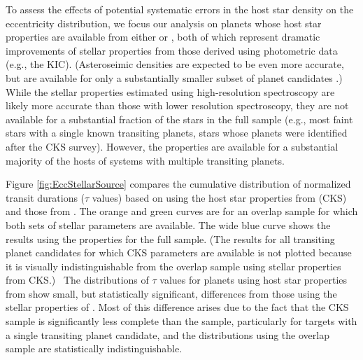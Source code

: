 \documentclass{aastex62}
\begin{document}
To assess the effects of potential systematic errors in the host star density on the eccentricity distribution, we focus our analysis on planets whose host star properties are available from either \citet{Fulton:2018} or \citet{Berger:2020a}, both of which represent dramatic improvements of stellar properties from those derived using photometric data (e.g., the KIC).  (Asteroseimic densities are expected to be even more accurate, but are available for only a substantially smaller subset of planet candidates \citep{vanEylen:2015,vanEylen:2019}.)  
While the stellar properties estimated using high-resolution spectroscopy \citep{Fulton:2018} are likely more accurate than those with lower resolution spectroscopy, they are not available for a substantial fraction of the stars in the full sample (e.g., most faint stars with a single known transiting planets, stars whose planets were identified after the CKS survey).  However, the \cite{Fulton:2018} properties are available for a substantial majority of the hosts of systems with multiple transiting planets.

Figure \ref{fig:EccStellarSource} compares the cumulative distribution of normalized transit durations ($\tau$ values) based on using the  host star properties from \citet{Fulton:2018} (CKS) and those from \citet{Berger:2020a}.  The orange and green curves are for an overlap sample for which both sets of stellar parameters are available.  The wide blue curve shows the results using the \citet{Berger:2020a} properties for the full sample.  (The results for all transiting planet candidates for which CKS parameters are available is not plotted because it is visually indistinguishable from the overlap sample using stellar properties from CKS.)  ~The distributions of $\tau$ values for planets using host star properties from \citet{Fulton:2018} show small, but statistically significant, differences from those using the stellar properties of \citet{Berger:2020a}.  Most of this difference arises due to the fact that the CKS sample is significantly less complete than the \citet{Berger:2020a} sample, particularly for targets with a single transiting planet candidate, and the distributions using the overlap sample are statistically indistinguishable.  
\end{document}
